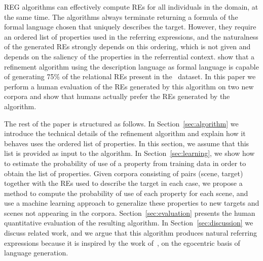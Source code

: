 REG algorithms can effectively compute REs for all individuals in the domain, at the same time. The algorithms always terminate returning a formula of the formal language chosen that uniquely describes the target. 
However, they require an ordered list of properties used in the referring expressions, and the naturalness of the generated REs strongly depends on this ordering, which is not given and depends on the saliency of the properties in the referrential context. \cite{arec:2012:coling12} show that a refinement algorithm using the description language \el as formal language is capable of generating 75\% of the relational REs present in the~\cite{viet:gene11} dataset. In this paper we perform a human evaluation of the REs generated by this algorithm on two new corpora and show that humans actually prefer the REs generated by the algorithm.  

The rest of the paper is structured as follows. In Section~\ref{sec:algorithm} we introduce the technical details of the 
refinement algorithm and explain how it behaves uses the ordered list of properties. In this section, we assume that this list is provided as 
input to the algorithm. In Section~\ref{sec:learning}, we show how to estimate the probability of use of a property from training data in order to obtain the list of properties. Given corpora consisting of pairs (scene, target) together with the REs used to 
describe the target in each case, we propose a method to compute the probability of use of each property for each scene, and use a machine learning approach to generalize these properties to new targets and scenes not appearing in the corpora. Section~\ref{sec:evaluation} presents the human quantitative evaluation of the resulting algorithm. In Section~\ref{sec:discussion} we discuss related work, and we argue that this algorithm produces natural referring expressions because it is inspired by the work of~\cite{keysar:Curr98}, on the egocentric basis of language generation. 

